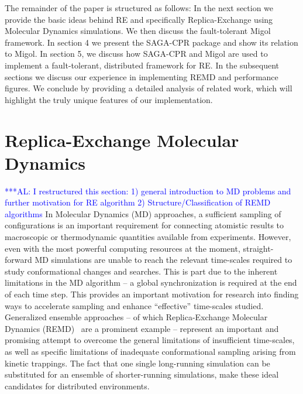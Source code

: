 \documentclass{rspublic}
\newcommand{\up}{}%
\newcommand{\alnote}[1]{ {\textcolor{blue} { ***AL: #1 }}}
\newcommand{\jhanote}[1]{ {\textcolor{red} { ***SJ: #1 }}}
\newcommand{\alnote}[1]{}
\newcommand{\jhanote}[1]{}
\begin{document}

The remainder of the paper is structured as follows: In the next
section we provide the basic ideas behind RE and specifically
Replica-Exchange using Molecular Dynamics simulations.  We then
discuss the fault-tolerant Migol framework. In section 4 we present
the SAGA-CPR package and show its relation to Migol. In section 5, we
discuss how SAGA-CPR and Migol are used to implement a fault-tolerant,
distributed framework for RE.  In the subsequent sections we discuss
our experience in implementing REMD and performance figures. We
conclude by providing a detailed analysis of related work, which will
highlight the truly unique features of our implementation.


\up
\section{Replica-Exchange Molecular Dynamics}
\alnote{I restructured this section: 1) general introduction to MD
  problems and further motivation for RE algorithm 2)
  Structure/Classification of REMD algorithms} \up In Molecular
Dynamics (MD) approaches, a sufficient sampling of configurations is
an important requirement for connecting atomistic results to
macroscopic or thermodynamic quantities available from experiments.
However, even with the most powerful computing resources at the
moment, straight-forward MD simulations are unable to reach the
relevant time-scales required to study conformational changes and
searches. This is part due to the inherent limitations in the MD
algorithm -- a global synchronization is required at the end of each
time step.  This provides an important motivation for research into
finding ways to accelerate sampling and enhance ``effective''
time-scales studied. Generalized ensemble approaches -- of which
Replica-Exchange Molecular Dynamics (REMD)~\cite{Sugita:1999rm} are a
prominent example -- represent an important and promising attempt to
overcome the general limitations of insufficient time-scales, as well
as specific limitations of inadequate conformational sampling arising
from kinetic trappings.  The fact that one single long-running
simulation can be substituted for an ensemble of shorter-running
simulations, make these ideal candidates for distributed environments.
\end{document}
